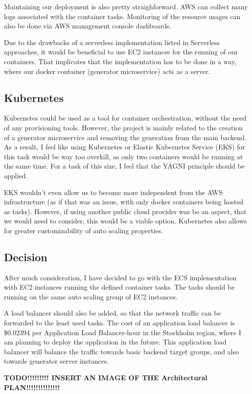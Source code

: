 		Maintaining our deployment is also pretty straighforward. AWS can collect many logs associated with 
		the container tasks. Monitoring of the resource usages can also be done via AWS management console dashboards.

		Due to the drawbacks of a serverless implementation listed in Serverless approaches, it would be beneficial to use EC2 instances
		for the running of our containers. That implicates that the implementation has to be done in a way, where our docker container (generator
		microservice) acts as a server.

	\subsection{Kubernetes}
		Kubernetes could be used as a tool for container orchestration, without the need of any provisioning tools. 
		However, the project is mainly related to the creation of a generator
		microservice and removing the generation from the main backend. As a result, I feel like using 
		Kubernetes or Elastic Kubernetes Service (EKS) for this task
		would be way too overkill, as only two containers would be running at the same time. 
		For a task of this size, I feel that the YAGNI principle should be applied.
		
		EKS wouldn't even allow us to become more independent
		from the AWS infrastructure (as if that was an issue, with only docker containers being hosted as tasks). However, if using another 
		public cloud provider was be an aspect, that we would need to consider, this would be a viable option. Kubernetes also allows for 
		greater customizability of auto scaling properties.

	\subsection{Decision}
		After much consideration, I have decided to go with the ECS implementation with EC2 instances running the defined container tasks.
		The tasks should be running on the same auto scaling group of EC2 instances. 
		
		A load balancer should also be added, so that the 
		network traffic can be forwarded to the least used tasks. The cost of an application load balancer is \$0.02394 per Application 
		Load Balancer-hour in the Stockholm region, where I am planning to deploy the application in the future. This application load balancer
		will balance the traffic towards basic backend target groups, and also towards generator server instances.

		\textbf{TODO!!!!!!!!! INSERT AN IMAGE OF THE Architectural PLAN!!!!!!!!!!!!!!}
